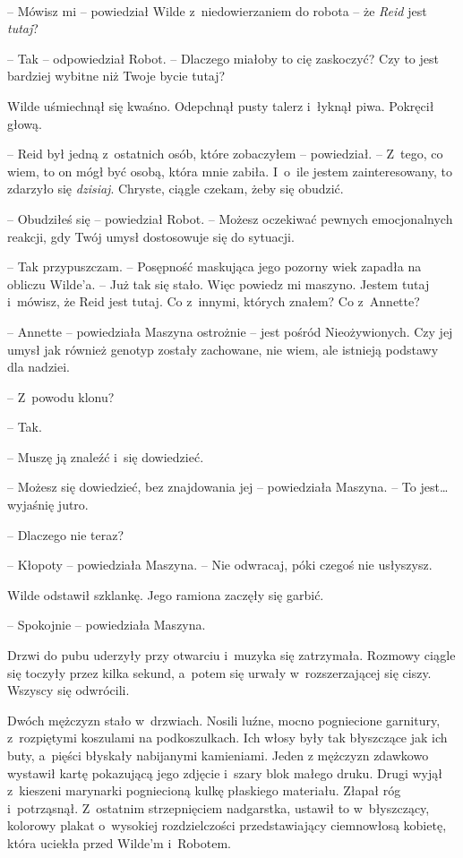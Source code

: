 \documentclass[oneside,polish,11pt,sfheadings]{mwbk}
\begin{document}
~

-- Mówisz mi -- powiedział Wilde z~niedowierzaniem do robota -- że
\emph{Reid} jest \emph{tutaj}?

-- Tak -- odpowiedział Robot. -- Dlaczego miałoby to cię zaskoczyć? Czy to
jest bardziej wybitne niż Twoje bycie tutaj?

Wilde uśmiechnął się kwaśno. Odepchnął pusty talerz i~łyknął piwa.
Pokręcił głową.

-- Reid był jedną z~ostatnich osób, które zobaczyłem -- powiedział. -- Z~tego, co wiem, to on mógł być osobą, która mnie zabiła. I~o~ile jestem
zainteresowany, to zdarzyło się \emph{dzisiaj}. Chryste, ciągle czekam,
żeby się obudzić.

-- Obudziłeś się -- powiedział Robot. -- Możesz oczekiwać pewnych
emocjonalnych reakcji, gdy Twój umysł dostosowuje się do sytuacji.

-- Tak przypuszczam. -- Posępność maskująca jego pozorny wiek zapadła na
obliczu Wilde'a. -- Już tak się stało. Więc powiedz mi maszyno. Jestem
tutaj i~mówisz, że Reid jest tutaj. Co z~innymi, których znałem? Co z~Annette?

-- Annette -- powiedziała Maszyna ostrożnie -- jest pośród Nieożywionych.
Czy jej umysł jak również genotyp zostały zachowane, nie wiem, ale
istnieją podstawy dla nadziei.

-- Z~powodu klonu?

-- Tak.

-- Muszę ją znaleźć i~się dowiedzieć.

-- Możesz się dowiedzieć, bez znajdowania jej -- powiedziała Maszyna. -- To
jest\ldots wyjaśnię jutro.

-- Dlaczego nie teraz?

-- Kłopoty -- powiedziała Maszyna. -- Nie odwracaj, póki czegoś nie
usłyszysz.

Wilde odstawił szklankę. Jego ramiona zaczęły się garbić.

-- Spokojnie -- powiedziała Maszyna.

Drzwi do pubu uderzyły przy otwarciu i~muzyka się zatrzymała. Rozmowy
ciągle się toczyły przez kilka sekund, a~potem się urwały w~rozszerzającej się ciszy. Wszyscy się odwrócili.

Dwóch mężczyzn stało w~drzwiach. Nosili luźne, mocno pogniecione
garnitury, z~rozpiętymi koszulami na podkoszulkach. Ich włosy były tak
błyszczące jak ich buty, a~pięści błyskały nabijanymi kamieniami. Jeden
z mężczyzn zdawkowo wystawił kartę pokazującą jego zdjęcie i~szary blok
małego druku. Drugi wyjął z~kieszeni marynarki pogniecioną kulkę
płaskiego materiału. Złapał róg i~potrząsnął. Z~ostatnim strzepnięciem
nadgarstka, ustawił to w~błyszczący, kolorowy plakat o~wysokiej
rozdzielczości przedstawiający ciemnowłosą kobietę, która uciekła
przed Wilde'm i~Robotem.
\end{document}
